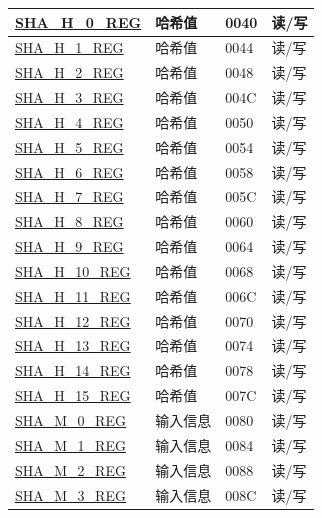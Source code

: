 \begin{longtable}{ | p{6cm} | p{7.2cm} | p{1.3cm} | p{1.5cm} | }
\hyperref[regdesc:SHAHNREG]{SHA\_H\_0\_REG} & 哈希值 & \hexprefix{}0040 & 读/写 \\ \hline
\hyperref[regdesc:SHAHNREG]{SHA\_H\_1\_REG} & 哈希值 & \hexprefix{}0044 & 读/写 \\ \hline
\hyperref[regdesc:SHAHNREG]{SHA\_H\_2\_REG} & 哈希值 & \hexprefix{}0048 & 读/写 \\ \hline
\hyperref[regdesc:SHAHNREG]{SHA\_H\_3\_REG} & 哈希值 & \hexprefix{}004C & 读/写 \\ \hline
\hyperref[regdesc:SHAHNREG]{SHA\_H\_4\_REG} & 哈希值 & \hexprefix{}0050 & 读/写 \\ \hline
\hyperref[regdesc:SHAHNREG]{SHA\_H\_5\_REG} & 哈希值 & \hexprefix{}0054 & 读/写 \\ \hline
\hyperref[regdesc:SHAHNREG]{SHA\_H\_6\_REG} & 哈希值 & \hexprefix{}0058 & 读/写 \\ \hline
\hyperref[regdesc:SHAHNREG]{SHA\_H\_7\_REG} & 哈希值 & \hexprefix{}005C & 读/写 \\ \hline
\hyperref[regdesc:SHAHNREG]{SHA\_H\_8\_REG} & 哈希值 & \hexprefix{}0060 & 读/写 \\ \hline
\hyperref[regdesc:SHAHNREG]{SHA\_H\_9\_REG} & 哈希值 & \hexprefix{}0064 & 读/写 \\ \hline
\hyperref[regdesc:SHAHNREG]{SHA\_H\_10\_REG} & 哈希值 & \hexprefix{}0068 & 读/写 \\ \hline
\hyperref[regdesc:SHAHNREG]{SHA\_H\_11\_REG} & 哈希值 & \hexprefix{}006C & 读/写 \\ \hline
\hyperref[regdesc:SHAHNREG]{SHA\_H\_12\_REG} & 哈希值 & \hexprefix{}0070 & 读/写 \\ \hline
\hyperref[regdesc:SHAHNREG]{SHA\_H\_13\_REG} & 哈希值 & \hexprefix{}0074 & 读/写 \\ \hline
\hyperref[regdesc:SHAHNREG]{SHA\_H\_14\_REG} & 哈希值 & \hexprefix{}0078 & 读/写 \\ \hline
\hyperref[regdesc:SHAHNREG]{SHA\_H\_15\_REG} & 哈希值 & \hexprefix{}007C & 读/写 \\ \hline
\hyperref[regdesc:SHAMNREG]{SHA\_M\_0\_REG} & 输入信息 & \hexprefix{}0080 & 读/写 \\ \hline
\hyperref[regdesc:SHAMNREG]{SHA\_M\_1\_REG} & 输入信息 & \hexprefix{}0084 & 读/写 \\ \hline
\hyperref[regdesc:SHAMNREG]{SHA\_M\_2\_REG} & 输入信息 & \hexprefix{}0088 & 读/写 \\ \hline
\hyperref[regdesc:SHAMNREG]{SHA\_M\_3\_REG} & 输入信息 & \hexprefix{}008C & 读/写 \\ \hline

\end{longtable}
